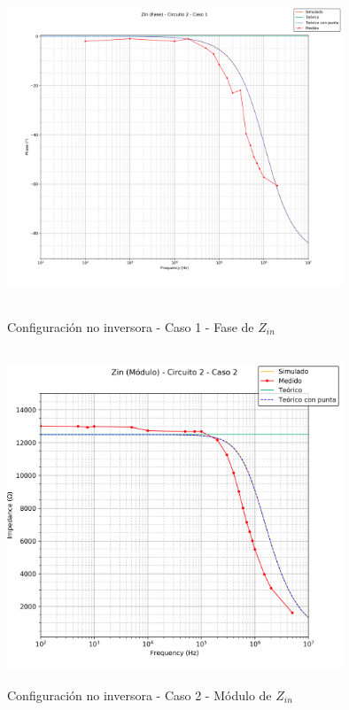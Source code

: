 \begin{figure}[H] %
	\centering
	\includegraphics[width=10cm,height=10cm,keepaspectratio]{../EJ1/00GRAFICOS/c2c1/c2c1zinFASE.png}
	\caption{Configuración no inversora - Caso 1 - Fase de $Z_{in}$}
	\label{c2c1zinP}
\end{figure}

\begin{figure}[H] %
	\centering
	\includegraphics[width=10cm,height=10cm,keepaspectratio]{../EJ1/00GRAFICOS/c2c2/c2c2ZINpunta.png}
	\caption{Configuración no inversora - Caso 2 - M\'odulo de $Z_{in}$}
	\label{c2c2zinM}
\end{figure}

